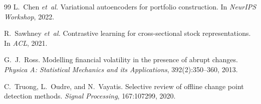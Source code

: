\documentclass[11pt]{article}
\begin{document}
\begin{thebibliography}{99}
L.~Chen \emph{et~al.}
\newblock Variational autoencoders for portfolio construction.
\newblock In \emph{NeurIPS Workshop}, 2022.

R.~Sawhney \emph{et~al.}
\newblock Contrastive learning for cross-sectional stock representations.
\newblock In \emph{ACL}, 2021.

G.~J.~Ross.
\newblock Modelling financial volatility in the presence of abrupt changes.
\newblock \emph{Physica A: Statistical Mechanics and its Applications}, 392(2):350--360, 2013.

C.~Truong, L.~Oudre, and N.~Vayatis.
\newblock Selective review of offline change point detection methods.
\newblock \emph{Signal Processing}, 167:107299, 2020.

\end{thebibliography}
\end{document}
